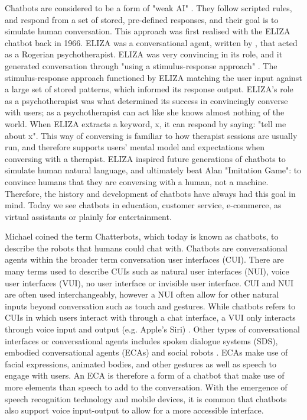 Chatbots are considered to be a form of "weak AI" \citep{DeAngeli2008}. They follow scripted rules, and respond from a set of stored, pre-defined responses, and their goal is to simulate human conversation. This approach was first realised with the ELIZA chatbot back in 1966. ELIZA was a conversational agent, written by \cite{Weizenbaum1966}, that acted as a Rogerian psychotherapist. ELIZA was very convincing in its role, and it generated conversation through "using a stimulus-response approach" \citep[: 57]{McTear2016b}. The stimulus-response approach functioned by ELIZA matching the user input against a large set of stored patterns, which informed its response output. ELIZA's role as a psychotherapist was what determined its success in convincingly converse with users; as a psychotherapist can act like she knows almost nothing of the world. When ELIZA extracts a keyword, x, it can respond by saying: "tell me about x". This way of conversing is familiar to how therapist sessions are usually run, and therefore supports users' mental model and expectations when conversing with a therapist. ELIZA inspired future generations of chatbots to simulate human natural language, and ultimately beat Alan \cite{Turing1950} "Imitation Game": to convince humans that they are conversing with a human, not a machine. Therefore, the history and development of chatbots have always had this goal in mind. Today we see chatbots in education, customer service, e-commerce, as virtual assistants or plainly for entertainment. 

Michael \cite{Mauldin1994} coined the term Chatterbots, which today is known as chatbots, to describe the robots that humans could chat with. Chatbots are conversational agents within the broader term conversation user interfaces (CUI). There are many terms used to describe CUIs such as natural user interfaces (NUI), voice user interfaces (VUI), no user interface or invisible user interface.  CUI and NUI are often used interchangeably, however a NUI often allow for other natural inputs beyond conversation such as touch and gestures. While chatbots refers to CUIs in which users interact with through a chat interface, a VUI only interacts through voice input and output (e.g. Apple's Siri) \citep{Pearl2017}. Other types of conversational interfaces or conversational agents includes spoken dialogue systems (SDS), embodied conversational agents (ECAs) and social robots \citep{McTear2016b}. ECAs make use of facial expressions, animated bodies, and other gestures as well as speech to engage with users. An ECA is therefore a form of a chatbot that make use of more elements than speech to add to the conversation. With the emergence of speech recognition technology and mobile devices, it is common that chatbots also support voice input-output to allow for a more accessible interface.

